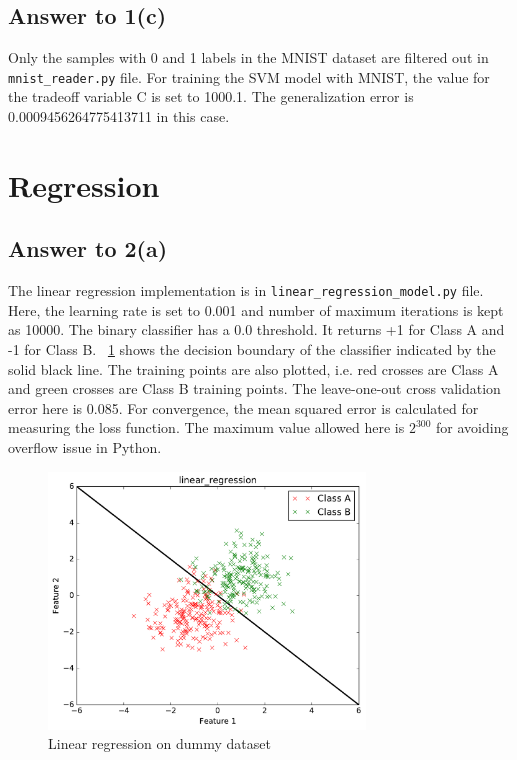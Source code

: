 \documentclass[runningheads]{llncs}
\begin{document}
\subsection{Answer to 1(c)}
Only the samples with 0 and 1 labels in the MNIST dataset are filtered out in \texttt{mnist\_reader.py} file.
For training the SVM model with MNIST, the value for the tradeoff variable C is set to 1000.1.
The generalization error is 0.0009456264775413711 in this case.

\section{Regression}

\subsection{Answer to 2(a)}
The linear regression implementation is in \texttt{linear\_regression\_model.py} file. Here, the learning rate is
set to 0.001 and number of maximum iterations is kept as 10000. The binary classifier has a 0.0 threshold.
It returns +1 for Class A and -1 for Class B. \figurename~\ref{fig:linear_dummy} shows the decision boundary
of the classifier indicated by the solid black line. The training points are also plotted, i.e. red crosses are
Class A and green crosses are Class B training points. The leave-one-out cross validation error here is 0.085.
For convergence, the mean squared error is calculated for measuring the loss function. The maximum value
allowed here is $2^{300}$ for avoiding overflow issue in Python.
\begin{figure}
\centering
\includegraphics[width=0.75\textwidth]{linear_regression.pdf}
\caption{Linear regression on dummy dataset} \label{fig:linear_dummy}
\end{figure}
\end{document}
